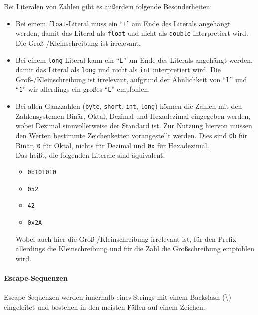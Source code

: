 	Bei Literalen von Zahlen gibt es außerdem folgende Besonderheiten:
	\begin{itemize}
		\item Bei einem \texttt{float}-Literal muss ein \enquote{\texttt{F}} am Ende des Literals angehängt werden, damit das Literal als \texttt{float} und nicht als \texttt{double} interpretiert wird. Die Groß-/Kleinschreibung ist irrelevant.
		\item Bei einem \texttt{long}-Literal kann ein \enquote{\texttt{L}} am Ende des Literals angehängt werden, damit das Literal als \texttt{long} und nicht als \texttt{int} interpretiert wird. Die Groß-/Kleinschreibung ist irrelevant, aufgrund der Ähnlichkeit von \enquote{\texttt{l}} und \enquote{\texttt{1}} wir allerdings ein großes \enquote{\texttt{L}} empfohlen.
		\item Bei allen Ganzzahlen (\texttt{byte}, \texttt{short}, \texttt{int}, \texttt{long}) können die Zahlen mit den Zahlensystemen Binär, Oktal, Dezimal und Hexadezimal eingegeben werden, wobei Dezimal sinnvollerweise der Standard ist. Zur Nutzung hiervon müssen den Werten bestimmte Zeichenketten vorangestellt werden. Dies sind \texttt{0b} für Binär, \texttt{0} für Oktal, nichts für Dezimal und \texttt{0x} für Hexadezimal. \\ Das heißt, die folgenden Literale sind äquivalent:
			\begin{itemize}
				\item \texttt{0b101010}
				\item \texttt{052}
				\item \texttt{42}
				\item \texttt{0x2A}
			\end{itemize}
			Wobei auch hier die Groß-/Kleinschreibung irrelevant ist, für den Prefix allerdings die Kleinschreibung und für die Zahl die Großschreibung empfohlen wird.
	\end{itemize}
	
	
	\paragraph{Escape-Sequenzen}
		Escape-Sequenzen werden innerhalb eines Strings mit einem Backslash (\textbackslash) eingeleitet und bestehen in den meisten Fällen auf einem Zeichen.
		
